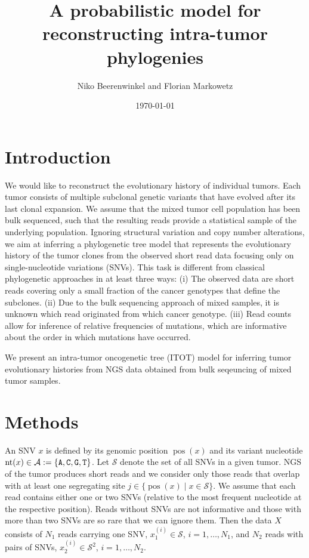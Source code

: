 \documentclass[12pt,a4paper]{amsart}
\newcommand{\cA}{\mathcal{A}}
\newcommand{\cS}{\mathcal{S}}
\DeclareMathOperator{\pos}{pos}
\DeclareMathOperator{\nt}{nt}
\begin{document}

\title{A probabilistic model for reconstructing intra-tumor phylogenies}



\author{
Niko Beerenwinkel and Florian Markowetz
}

\date{\today}




\maketitle


\section{Introduction}

We would like to reconstruct the evolutionary history of individual tumors. Each tumor consists of multiple subclonal genetic variants that have evolved after its last clonal expansion. 
We assume that the mixed tumor cell population has been bulk sequenced, such that the resulting reads provide a statistical sample of the underlying population. Ignoring structural variation and copy number alterations, we aim at inferring a phylogenetic tree model that represents the evolutionary history of the tumor clones from the observed short read data focusing only on single-nucleotide variations (SNVs). This task is different from classical phylogenetic approaches in at least three ways: (i) The observed data are short reads covering only a small fraction of the cancer genotypes that define the subclones. (ii) Due to the bulk sequencing approach of mixed samples, it is unknown which read originated from which cancer genotype. (iii) Read counts allow for inference of relative frequencies of mutations, which are informative about the order in which mutations have occurred.   

We present an intra-tumor oncogenetic tree (ITOT) model for inferring tumor evolutionary histories from NGS data obtained from bulk seqeuncing of mixed tumor samples.

\section{Methods}

An SNV $x$ is defined by its genomic position $\pos(x)$ and its variant nucleotide $\nt(x) \in \cA := \{{\tt A,C,G,T}\}$.
Let $\cS$ denote the set of all SNVs in a given tumor.
NGS of the tumor produces short reads and we consider only those reads that overlap
with at least one segregating site $j \in \{\pos(x) \mid x \in \cS\}$.
We assume that each read contains either one or two SNVs (relative to the most frequent nucleotide at the respective position). Reads without SNVs are not informative and those with more than two SNVs are so rare that we can ignore them. 
Then the data $X$ consists of $N_1$ reads carrying one SNV, $x_1^{(i)} \in \cS$, $i=1,\dots,N_1$, and $N_2$ reads with
pairs of SNVs, $x_2^{(i)} \in \cS^2$, $i=1,\dots,N_2$. 
\end{document}
